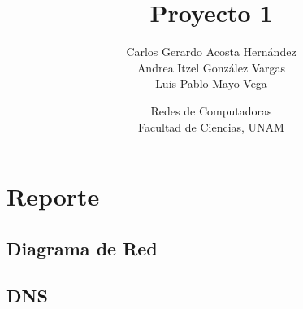 \documentclass[9pt]{article}
\begin{document}
\title{Proyecto 1}
\author{Carlos Gerardo Acosta Hernández \\ Andrea Itzel González Vargas \\ Luis Pablo Mayo Vega}
\date{Redes de Computadoras\\Facultad de Ciencias, UNAM}
\maketitle

\section*{Reporte}

\subsection*{Diagrama de Red}

\subsection*{DNS}
\end{document}
